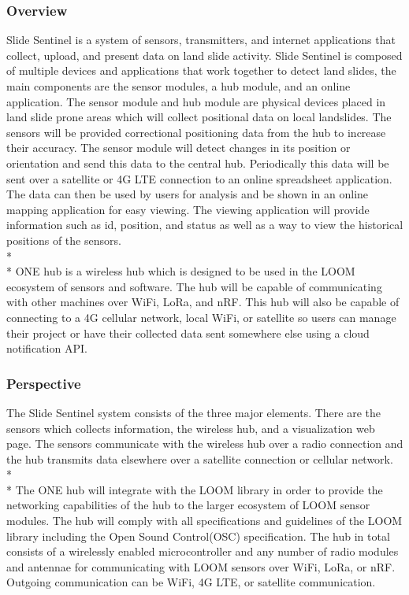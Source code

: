 \documentclass[onecolumn, draftclsnofoot,10pt, compsoc]{IEEEtran}
\begin{document}
\subsubsection{Overview}
Slide Sentinel is a system of sensors, transmitters, and internet applications that collect, upload, and present data on land slide activity. Slide Sentinel is composed of multiple devices and applications that work together to detect land slides, the main components are the sensor modules, a hub module, and an online application. The sensor module and hub module are physical devices placed in land slide prone areas which will collect positional data on local landslides. The sensors will be provided correctional positioning data from the hub to increase their accuracy. The sensor module will detect changes in its position or orientation and send this data to the central hub. Periodically this data will be sent over a satellite or 4G LTE connection to an online spreadsheet application. The data can then be used by users for analysis and be shown in an online mapping application for easy viewing. The viewing application will provide information such as id, position, and status as well as a way to view the historical positions of the sensors.
\\* \\*
ONE hub is a wireless hub which is designed to be used in the LOOM ecosystem of sensors and software. The hub will be capable of communicating with other machines over WiFi, LoRa, and nRF. This hub will also be capable of connecting to a 4G cellular network, local WiFi, or satellite so users can manage their project or have their collected data sent somewhere else using a cloud notification API.

\subsubsection{Perspective}

The Slide Sentinel system consists of the three major elements. There are the sensors which collects information, the wireless hub, and a visualization web page. The sensors communicate with the wireless hub over a radio connection and the hub transmits data elsewhere over a satellite connection or cellular network.
\\* \\*
The ONE hub will integrate with the LOOM library in order to provide the networking capabilities of the hub to the larger ecosystem of LOOM sensor modules. The hub will comply with all specifications and guidelines of the LOOM library including the Open Sound Control(OSC) specification. The hub in total consists of a wirelessly enabled microcontroller and any number of radio modules and antennae for communicating with LOOM sensors over WiFi, LoRa, or nRF. Outgoing communication can be WiFi, 4G LTE, or satellite communication.
\end{document}
